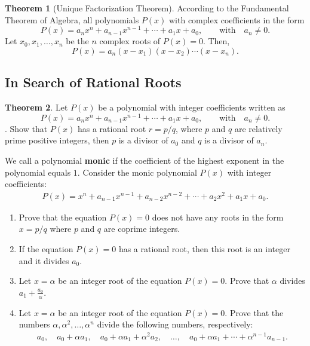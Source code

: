 \documentclass[12pt,a4paper]{memoir}
\theoremstyle{definition}
\newtheorem{theorem}{Theorem}
\begin{document}
\begin{theorem}[Unique Factorization Theorem]
	According to the Fundamental Theorem of Algebra, all polynomials $P(x)$ with complex coefficients in the form
	\[P(x)=a_nx^n+a_{n-1}x^{n-1}+\cdots+a_1x+a_0, \qquad \text{with} \quad a_n\neq 0.\]
	Let $x_0,x_1,\dots,x_n$ be the $n$ complex roots of $P(x)=0$. Then, 
	\[P(x)=a_n(x-x_1)(x-x_2)\cdots(x-x_n).\]
\end{theorem}



\subsection{In Search of Rational Roots}

\begin{tcolorbox}[title={Rational Root Theorem}]
	\begin{theorem}
		Let $P(x)$ be a polynomial with integer coefficients written as \[P(x)=a_nx^n+a_{n-1}x^{n-1}+\cdots+a_1x+a_0, \qquad \text{with} \quad a_n\neq 0.\]. Show that $P(x)$ has a rational root $r=p/q$, where $p$ and $q$ are relatively prime positive integers, then $p$ is a divisor of $a_0$ and $q$ is a divisor of $a_n$.
	\end{theorem}
\end{tcolorbox}


\begin{question}
	We call a polynomial \textbf{monic} if the coefficient of the highest exponent in the polynomial equals $1$. Consider the monic polynomial $P(x)$ with integer coefficients:
	\begin{align*}
		P(x)=x^n + a_{n-1}x^{n-1} + a_{n-2}x^{n-2} + \cdots + a_2x^2+a_1x+a_0.
	\end{align*}
	\begin{enumerate}
		\item Prove that the equation $P(x)=0$ does not have any roots in the form $x=p/q$ where $p$ and $q$ are coprime integers.
		\item If the equation $P(x)=0$ has a rational root, then this root is an integer and it divides $a_0$.
		\item Let $x=\alpha$ be an integer root of the equation $P(x)=0$. Prove that $\alpha$ divides $a_1 + \frac{a_0}{\alpha}$.
		\item Let $x=\alpha$ be an integer root of the equation $P(x)=0$. Prove that the numbers $\alpha, \alpha^2, \dots, \alpha^n$ divide the following numbers, respectively:
		\begin{align*}
			a_0, \quad a_0+\alpha a_1, \quad a_0+\alpha a_1+\alpha^2 a_2, \quad\dots, \quad a_0+\alpha a_1+\cdots+\alpha^{n-1} a_{n-1}.
		\end{align*}
	\end{enumerate}
\end{question}
\end{document}

